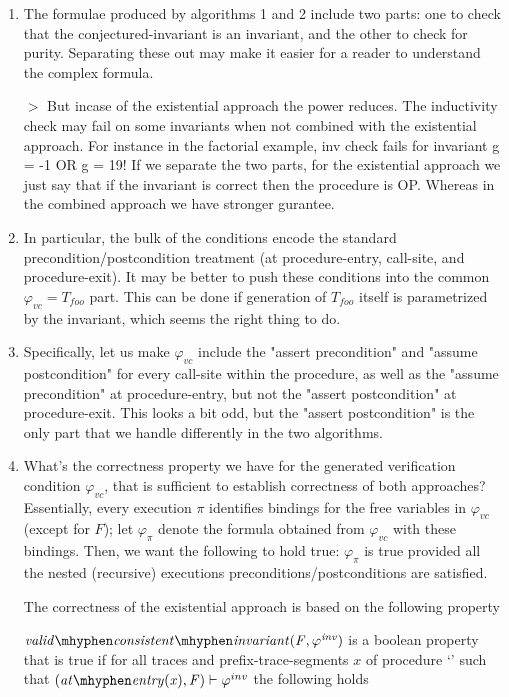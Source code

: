 \begin{enumerate}
\begin{enumerate}
\item The formulae produced by algorithms 1 and 2 include two parts:
one to check that the conjectured-invariant is an invariant, and the
other to check for purity. Separating these out may make it easier for
a reader to understand the complex formula.

$>$ But incase of the existential approach the power reduces. The
inductivity check may fail on some invariants when not combined with
the existential approach. For instance in the factorial example, inv
check fails for invariant g = -1 OR g = 19! If we separate the two
parts, for the existential approach we just say that if the invariant
is correct then the procedure is OP. Whereas in the combined approach
we have stronger gurantee. 

\item In particular, the bulk of the conditions encode the standard
precondition/postcondition treatment (at procedure-entry, call-site,
and procedure-exit). It may be better to push these conditions into
the common $\varphi_{vc} = T_{foo}$ part. This can be done if generation of
$T_{foo}$ itself is parametrized by the invariant, which seems the right thing to do.

\item Specifically, let us make $\varphi_{vc}$ include the "assert precondition"
and "assume postcondition" for every call-site within the procedure, as well
as the "assume precondition" at procedure-entry, but not the "assert
postcondition" at procedure-exit. This looks a bit odd, but the "assert
postcondition" is the only part that we handle differently in the two algorithms.

\item What's the correctness property we have for the generated verification
condition $\varphi_{vc}$, that is sufficient to establish correctness of both approaches?
Essentially, every execution $\pi$ identifies bindings for the free variables in $\varphi_{vc}$ (except for $F$);
let $\varphi_\pi$ denote the formula obtained from $\varphi_{vc}$ with these bindings.
Then, we want the following to hold true: $\varphi_\pi$ is true provided all the
nested (recursive) executions preconditions/postconditions are satisfied.

The correctness of the existential approach is based on the following property



\begin{definition}
  \label{def:validConsistentInvariant}
  $\\\vci{\F}{\inv}$ is a boolean property that is true if for all
  traces and prefix-trace-segments $x$ of procedure `\foo' such that
  $(\atEntry{x}, \F) \satisfies \inv$ the following holds


\end{definition}
\end{enumerate}
\end{enumerate}
